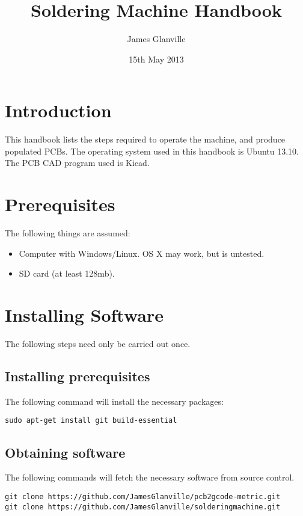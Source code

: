 \documentclass[a4paper,11pt]{article}  %
\title{Soldering Machine Handbook}
\author{James Glanville}
\date{15th May 2013}
\begin{document}
\maketitle

\tableofcontents

\newpage

\section{Introduction}

This handbook lists the steps required to operate the machine, and
produce populated PCBs. The operating system used in this handbook is
Ubuntu 13.10. The PCB CAD program used is Kicad.

\section{Prerequisites}
The following things are assumed:

\begin{itemize}
	\item	Computer with Windows/Linux. OS X may work, but is untested.
	\item	SD card (at least 128mb).
\end{itemize}

\section{Installing Software}
The following steps need only be carried out once.

\subsection{Installing prerequisites}
The following command will install the necessary packages:

\begin{lstlisting}
sudo apt-get install git build-essential
\end{lstlisting}

\subsection{Obtaining software}
The following commands will fetch the necessary software from source control.

\begin{lstlisting}
git clone https://github.com/JamesGlanville/pcb2gcode-metric.git
git clone https://github.com/JamesGlanville/solderingmachine.git
\end{lstlisting}
\end{document}
